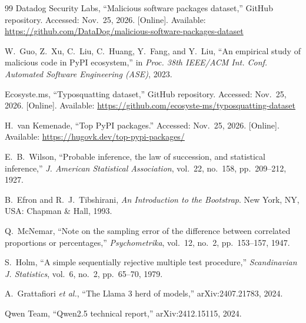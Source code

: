 \documentclass[conference]{IEEEtran}
\begin{document}
\begin{thebibliography}{99}
Datadog Security Labs, ``Malicious software packages dataset,'' GitHub repository. Accessed: Nov.~25, 2026. [Online].
Available: \url{https://github.com/DataDog/malicious-software-packages-dataset}

W.~Guo, Z.~Xu, C.~Liu, C.~Huang, Y.~Fang, and Y.~Liu,
``An empirical study of malicious code in PyPI ecosystem,''
in \emph{Proc. 38th IEEE/ACM Int. Conf. Automated Software Engineering (ASE)}, 2023.

Ecosyste.ms, ``Typosquatting dataset,'' GitHub repository. Accessed: Nov.~25, 2026. [Online]. Available:
\url{https://github.com/ecosyste-ms/typosquatting-dataset}

H.~van Kemenade, ``Top PyPI packages.'' Accessed: Nov.~25, 2026. [Online]. Available: \url{https://hugovk.dev/top-pypi-packages/}

E.~B.~Wilson, ``Probable inference, the law of succession, and statistical inference,'' \emph{J. American
Statistical Association}, vol.~22, no.~158, pp.~209--212, 1927.

B.~Efron and R.~J.~Tibshirani, \emph{An Introduction to the Bootstrap}. New York, NY, USA: Chapman \& Hall, 1993.

Q.~McNemar, ``Note on the sampling error of the difference between correlated proportions or percentages,''
\emph{Psychometrika}, vol.~12, no.~2, pp.~153--157, 1947.

S.~Holm, ``A simple sequentially rejective multiple test procedure,'' \emph{Scandinavian J. Statistics},
vol.~6, no.~2, pp.~65--70, 1979.

A.~Grattafiori \emph{et al.}, ``The Llama 3 herd of models,'' arXiv:2407.21783, 2024.

Qwen Team, ``Qwen2.5 technical report,'' arXiv:2412.15115, 2024.

\end{thebibliography}
\end{document}
